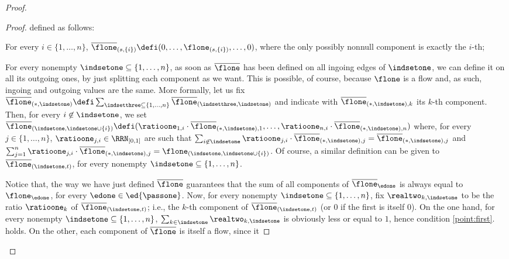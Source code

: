 \begin{proof}
\begin{varitemize}
\begin{proof}
      defined as follows:
\begin{varitemize}
      \item For every $i\in\{1,\dots,n\}$,
        $\overline{\flone}_{(s,\{i\})}\defi(0,\dots,\flone_{(s,\{i\})},\dots,0)$,
        where the only possibly nonnull component is exactly the $i$-th;
      \item For every nonempty $\indsetone\subseteq\{1,\dots,n\}$, as soon as
        $\overline{\flone}$ has been defined on all ingoing edges of
        $\indsetone$, we can define it on all its outgoing ones, by just
        splitting each component as we want. This is possible, of course,
        because $\flone$ is a flow and, as such, ingoing and outgoing values
        are the same. More formally, let us fix
        $\overline{\flone}_{(*,\indsetone)}\defi\sum_{\indsetthree\subseteq\{1,\dots,n\}}\overline{\flone}_{(\indsetthree,\indsetone)}$
        and indicate with $\overline{\flone}_{(*,\indsetone),k}$ its $k$-th
        component. Then, for every $i\not\in\indsetone$, we set
        $\overline{\flone}_{(\indsetone,\indsetone\cup\{i\})}\defi(\ratioone_{1,i}\cdot\overline{\flone}_{(*,\indsetone),1},\dots,\ratioone_{n,i}\cdot
        \overline{\flone}_{(*,\indsetone),n})$ where, for every
        $j\in\{1,\dots,n\}$, $\ratioone_{j,i}\in\RRN_{[0,1]}$ are such that
        $\sum_{i\not\in\indsetone}
        \ratioone_{j,i}\cdot\overline{\flone}_{(*,\indsetone),j}=\overline{\flone}_{(*,\indsetone),j}$
        and
        $\sum_{j=1}^n\ratioone_{j,i}\cdot\overline{\flone}_{(*,\indsetone),j}=
        \flone_{(\indsetone,\indsetone\cup\{i\})}$. Of course, a similar
        definition can be given to $\overline{\flone}_{(\indsetone,t)}$, for
        every nonempty $\indsetone\subseteq\{1,\dots,n\}$.
      \end{varitemize}
      Notice that, the way we have just defined $\overline{\flone}$
      guarantees that the sum of all components of $\overline{\flone}_\edone$
      is always equal to $\flone_\edone$, for every
      $\edone\in\ed{\passone}$. Now, for every nonempty
      $\indsetone\subseteq\{1,\dots,n\}$, fix $\realtwo_{k,\indsetone}$ to be
      the ratio $\ratioone_k$ of $\overline{\flone}_{(\indsetone,t)}$; i.e.,
      the $k$-th component of $\overline{\flone}_{(\indsetone,t)}$ (or $0$ if
      the first is itself $0$). On the one hand, for every nonempty
      $\indsetone\subseteq\{1,\dots,n\}$,
      $\sum_{k\in\indsetone}\realtwo_{k,\indsetone}$ is obviously less or
      equal to $1$, hence condition \ref{point:first}. holds. On the other,
      each component of $\overline{\flone}$ is itself a flow, since it

\end{proof}
\end{varitemize}
\end{proof}
